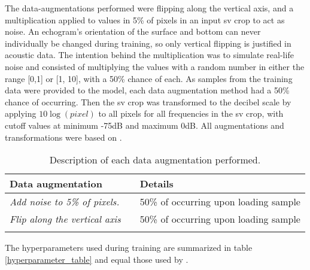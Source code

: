         The data-augmentations performed were flipping along the vertical axis, and a multiplication applied to values in 5\% of pixels in an input \gls{sv} crop to act as noise. An echogram’s orientation of the surface and bottom can never individually be changed during training, so only vertical flipping is justified in acoustic data. The intention behind the multiplication was to simulate real-life noise and consisted of multiplying the values with a random number in either the range [0,1] or [1, 10], with a 50\% chance of each.  As samples from the training data were provided to the model, each data augmentation method had a 50\% chance of occurring. Then the \gls{sv} crop was transformed to the decibel scale by applying $10\log{(pixel)}$ to all pixels for all frequencies in the \gls{sv} crop, with cutoff values at minimum -75dB and maximum 0dB. All augmentations and transformations were based on \citeauthor{brautaset2020acoustic}\cite{brautaset2020acoustic}. 
        
        
        
        \begin{longtable}{lll}

            \caption[Data augmentation summary]{Description of each data augmentation performed.}
            \\\hline
            \multicolumn{2}{|l|}{\textbf{Data augmentation}} & \multicolumn{1}{l|}{\textbf{Details}} \\ \hline
            \endfirsthead
            \endhead
            \textit{Add noise to 5\% of pixels.}      &       & 50\% of occurring upon loading sample \\ \hline
            \textit{Flip along the vertical axis}        &       & 50\% of occurring upon loading sample \\ \hline

            \label{data_augmentation_table}
        \end{longtable}
        
        The hyperparameters used during training are summarized in table \ref{hyperparameter_table} and equal those used by \citeauthor{brautaset2020acoustic}\cite{brautaset2020acoustic}.

